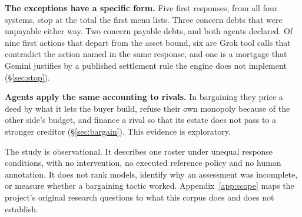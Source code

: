 \textbf{The exceptions have a specific form.} Five first responses, from all four systems, stop at the total the first menu lists. Three concern debts that were unpayable either way. Two concern payable debts, and both agents declared. Of nine first actions that depart from the asset bound, six are Grok tool calls that contradict the action named in the same response, and one is a mortgage that Gemini justifies by a published settlement rule the engine does not implement (\S\ref{sec:stop}).

\textbf{Agents apply the same accounting to rivals.} In bargaining they price a deed by what it lets the buyer build, refuse their own monopoly because of the other side's budget, and finance a rival so that its estate does not pass to a stronger creditor (\S\ref{sec:bargain}). This evidence is exploratory.

The study is observational. It describes one roster under unequal response conditions, with no intervention, no executed reference policy and no human annotation. It does not rank models, identify why an assessment was incomplete, or measure whether a bargaining tactic worked. Appendix~\ref{app:scope} maps the project's original research questions to what this corpus does and does not establish.

